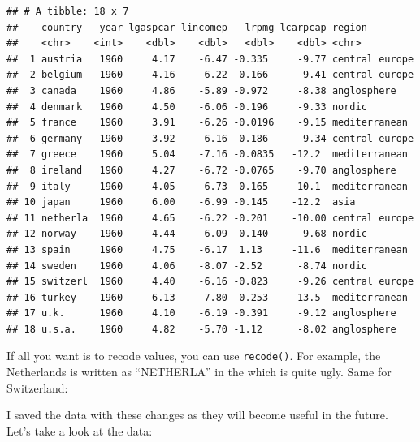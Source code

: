 \documentclass[]{gitbook}
\newenvironment{Shaded}{\begin{snugshade}}{\end{snugshade}}
\newcommand{\DataTypeTok}[1]{\textcolor[rgb]{0.13,0.29,0.53}{#1}}
\newcommand{\KeywordTok}[1]{\textcolor[rgb]{0.13,0.29,0.53}{\textbf{#1}}}
\newcommand{\NormalTok}[1]{#1}
\newcommand{\OperatorTok}[1]{\textcolor[rgb]{0.81,0.36,0.00}{\textbf{#1}}}
\newcommand{\StringTok}[1]{\textcolor[rgb]{0.31,0.60,0.02}{#1}}
\theoremstyle{definition}
\theoremstyle{definition}
\theoremstyle{definition}
\theoremstyle{remark}
\begin{document}
\begin{verbatim}
## # A tibble: 18 x 7
##    country   year lgaspcar lincomep   lrpmg lcarpcap region        
##    <chr>    <int>    <dbl>    <dbl>   <dbl>    <dbl> <chr>         
##  1 austria   1960     4.17    -6.47 -0.335     -9.77 central europe
##  2 belgium   1960     4.16    -6.22 -0.166     -9.41 central europe
##  3 canada    1960     4.86    -5.89 -0.972     -8.38 anglosphere   
##  4 denmark   1960     4.50    -6.06 -0.196     -9.33 nordic        
##  5 france    1960     3.91    -6.26 -0.0196    -9.15 mediterranean 
##  6 germany   1960     3.92    -6.16 -0.186     -9.34 central europe
##  7 greece    1960     5.04    -7.16 -0.0835   -12.2  mediterranean 
##  8 ireland   1960     4.27    -6.72 -0.0765    -9.70 anglosphere   
##  9 italy     1960     4.05    -6.73  0.165    -10.1  mediterranean 
## 10 japan     1960     6.00    -6.99 -0.145    -12.2  asia          
## 11 netherla  1960     4.65    -6.22 -0.201    -10.00 central europe
## 12 norway    1960     4.44    -6.09 -0.140     -9.68 nordic        
## 13 spain     1960     4.75    -6.17  1.13     -11.6  mediterranean 
## 14 sweden    1960     4.06    -8.07 -2.52      -8.74 nordic        
## 15 switzerl  1960     4.40    -6.16 -0.823     -9.26 central europe
## 16 turkey    1960     6.13    -7.80 -0.253    -13.5  mediterranean 
## 17 u.k.      1960     4.10    -6.19 -0.391     -9.12 anglosphere   
## 18 u.s.a.    1960     4.82    -5.70 -1.12      -8.02 anglosphere
\end{verbatim}

If all you want is to recode values, you can use \texttt{recode()}. For
example, the Netherlands is written as ``NETHERLA'' in the which is
quite ugly. Same for Switzerland:

\begin{Shaded}
\end{Shaded}

I saved the data with these changes as they will become useful in the
future. Let's take a look at the data:
\end{document}
